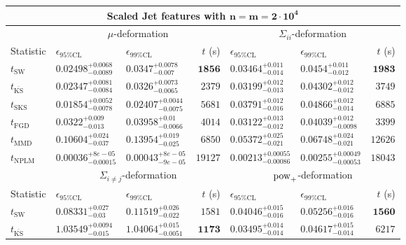 \begin{tabular}{l|llr|llr}
	\toprule
	\multicolumn{7}{c}{{\bf Scaled Jet features with $\mathbf{n=m=2\cdot 10^{4}}$}} \\
	\toprule
	\multicolumn{1}{c}{} & \multicolumn{3}{c}{$\mu$-deformation} & \multicolumn{3}{c}{$\Sigma_{ii}$-deformation} \\
	Statistic & $\epsilon_{95\%\mathrm{CL}}$ & $\epsilon_{99\%\mathrm    {CL}}$ & $t$ (s) & $\epsilon_{95\%\mathrm{CL}}$ & $\epsilon_{99\%\mathrm{CL}}$ & $t$ (s) \\
	\midrule
	$t_{\mathrm{SW}}$ & $0.02498_{-0.0089}^{+0.0068}$ & $0.0347_{-0.007}^{+0.0078}$ & ${\mathbf{1856}}$ & $0.03464_{-0.014}^{+0.011}$ & $0.0454_{-0.012}^{+0.011}$ & ${\mathbf{1983}}$ \\
	$t_{\overline{\mathrm{KS}}}$ & $0.02347_{-0.0084}^{+0.0081}$ & $0.0326_{-0.0065}^{+0.0073}$ & $2379$ & $0.03199_{-0.013}^{+0.012}$ & $0.04302_{-0.012}^{+0.012}$ & $3749$ \\
	$t_{\mathrm{SKS}}$ & ${\mathbf{0.01854_{-0.0078}^{+0.0052}}}$ & ${\mathbf{0.02407_{-0.0075}^{+0.0044}}}$ & $5681$ & $0.03791_{-0.016}^{+0.012}$ & $0.04866_{-0.014}^{+0.012}$ & $6885$ \\
	$t_{\mathrm{FGD}}$ & $0.0322_{-0.013}^{+0.009}$ & $0.03958_{-0.0066}^{+0.01}$ & $4014$ & ${\mathbf{0.03122_{-0.012}^{+0.013}}}$ & ${\mathbf{0.04039_{-0.0098}^{+0.012}}}$ & $3399$ \\
	$t_{\mathrm{MMD}}$ & $0.10604_{-0.037}^{+0.024}$ & $0.13954_{-0.025}^{+0.019}$ & $6850$ & $0.05372_{-0.021}^{+0.025}$ & $0.06748_{-0.021}^{+0.024}$ & $12626$ \\
\rowcolor{red!35}	$t_{\mathrm{NPLM}}$ & $0.00036_{-0.00015}^{+8e-05}$ & $0.00043_{-9e-05}^{+8e-05}$ & $19127$ & $0.00213_{-0.00086}^{+0.00055}$ & $0.00255_{-0.00053}^{+0.00049}$ & $18043$ \\
	\toprule
	\multicolumn{1}{c}{} & \multicolumn{3}{c}{$\Sigma_{i\neq j}$-deformation} & \multicolumn{3}{c}{$\rm{pow}_{+}$-deformation} \\
Statistic & $\epsilon_{95\%\mathrm{CL}}$ & $\epsilon_{99\%\mathrm{CL}}$ & $t$ (s) & $\epsilon_{95\%\mathrm{CL}}$ & $\epsilon_{99\%\mathrm{CL}}$ & $t$ (s) \\
	\midrule
	$t_{\mathrm{SW}}$ & $0.08331_{-0.03}^{+0.027}$ & $0.11519_{-0.022}^{+0.026}$ & $1581$ & $0.04046_{-0.016}^{+0.015}$ & $0.05256_{-0.016}^{+0.016}$ & ${\mathbf{1560}}$ \\
	$t_{\overline{\mathrm{KS}}}$ & $1.03549_{-0.015}^{+0.0094}$ & $1.04064_{-0.0051}^{+0.015}$ & ${\mathbf{1173}}$ & $0.03495_{-0.014}^{+0.014}$ & $0.04617_{-0.014}^{+0.015}$ & $6217$ \\

\end{tabular}
